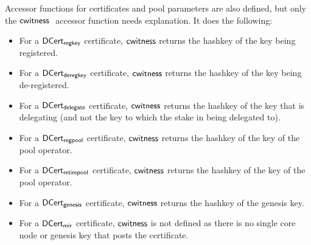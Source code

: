 Accessor functions for certificates and pool parameters are also defined, but
only the $\mathsf{cwitness}~ \mathit{}$ accessor function needs explanation.
It does the following:
\begin{itemize}
  \item For a $\mathsf{DCert_{regkey}}$ certificate, $\mathsf{cwitness}$ returns the hashkey
  of the key being registered.
\item For a $\mathsf{DCert_{deregkey}}$ certificate, $\mathsf{cwitness}$ returns the hashkey
  of the key being de-registered.
\item For a $\mathsf{DCert_{delegate}}$ certificate, $\mathsf{cwitness}$ returns the hashkey
  of the key that is delegating (and not the key to which the stake in being delegated to).
\item For a $\mathsf{DCert_{regpool}}$ certificate, $\mathsf{cwitness}$ returns the hashkey
  of the key of the pool operator.
\item For a $\mathsf{DCert_{retirepool}}$ certificate, $\mathsf{cwitness}$ returns the hashkey
  of the key of the pool operator.
\item For a $\mathsf{DCert_{genesis}}$ certificate, $\mathsf{cwitness}$ returns the hashkey
  of the genesis key.
\item For a $\mathsf{DCert_{mir}}$ certificate, $\mathsf{cwitness}$ is not defined as there is
  no single core node or genesis key that posts the certificate.
\end{itemize}

